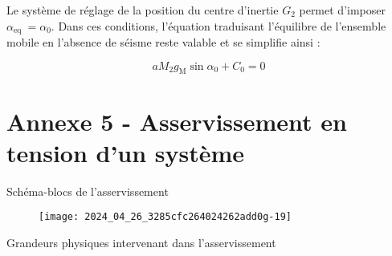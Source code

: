 Le système de réglage de la position du centre d'inertie $G_{2}$ permet d'imposer $\alpha_{\text {eq }}=\alpha_{0}$. Dans ces conditions, l'équation traduisant l'équilibre de l'ensemble mobile en l'absence de séisme reste valable et se simplifie ainsi :


\begin{equation*}
a M_{2} g_{\mathrm{M}} \sin \alpha_{0}+C_{0}=0 \tag{eq.1'}
\end{equation*}


\section*{Annexe 5 - Asservissement en tension d'un système}
Schéma-blocs de l'asservissement

\begin{figure}[!h]
\centering
\texttt{[image: 2024\_04\_26\_3285cfc264024262add0g-19]}
\end{figure}

Grandeurs physiques intervenant dans l'asservissement


